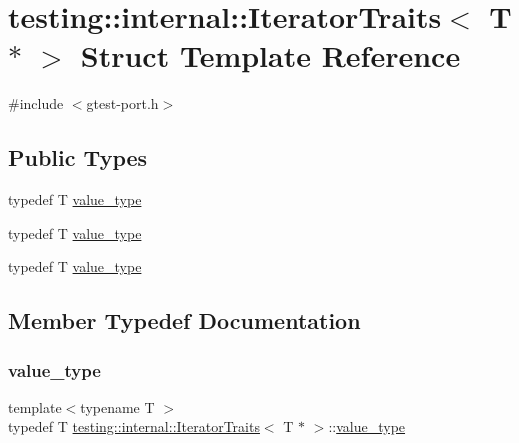 \hypertarget{structtesting_1_1internal_1_1_iterator_traits_3_01_t_01_5_01_4}{}\section{testing\+::internal\+::Iterator\+Traits$<$ T $\ast$ $>$ Struct Template Reference}
\label{structtesting_1_1internal_1_1_iterator_traits_3_01_t_01_5_01_4}


{\ttfamily \#include $<$gtest-\/port.\+h$>$}

\subsection*{Public Types}
\begin{DoxyCompactItemize}
\item 
typedef T \mbox{\hyperlink{structtesting_1_1internal_1_1_iterator_traits_3_01_t_01_5_01_4_a7e46869ed36cc5aea898e243d270a8be}{value\+\_\+type}}
\item 
typedef T \mbox{\hyperlink{structtesting_1_1internal_1_1_iterator_traits_3_01_t_01_5_01_4_a7e46869ed36cc5aea898e243d270a8be}{value\+\_\+type}}
\item 
typedef T \mbox{\hyperlink{structtesting_1_1internal_1_1_iterator_traits_3_01_t_01_5_01_4_a7e46869ed36cc5aea898e243d270a8be}{value\+\_\+type}}
\end{DoxyCompactItemize}


\subsection{Member Typedef Documentation}
\mbox{\label{structtesting_1_1internal_1_1_iterator_traits_3_01_t_01_5_01_4_a7e46869ed36cc5aea898e243d270a8be}} 
\subsubsection{\texorpdfstring{value\_type}{value\_type}\hspace{0.1cm}{\footnotesize\ttfamily [1/3]}}
{\footnotesize\ttfamily template$<$typename T $>$ \\
typedef T \mbox{\hyperlink{structtesting_1_1internal_1_1_iterator_traits}{testing\+::internal\+::\+Iterator\+Traits}}$<$ T $\ast$ $>$\+::\mbox{\hyperlink{structtesting_1_1internal_1_1_iterator_traits_3_01_t_01_5_01_4_a7e46869ed36cc5aea898e243d270a8be}{value\+\_\+type}}}

